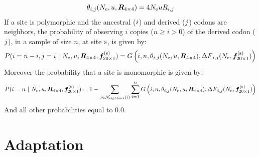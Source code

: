 \begin{equation}
\theta_{{i}, {j}}(N_{\textrm{e}}, u, \bm{R}_{4\times4}) = 4 N_{\textrm{e}} u R_{{i}, {j}}
\end{equation}
If a site is polymorphic and the ancestral (${i}$) and derived (${j}$) codons are neighbors, the probability of observing $i$ copies ($n \geq i > 0$) of the derived codon (${j}$), in a sample of size $n$, at site $\text{s}$, is given by:
\begin{equation}
P({i}=n-i,{j}=i \ |\ N_{\textrm{e}}, u, \bm{R}_{4\times4}, \bm{f}_{20\times1}^{(\text{s})}) = G\left(i, n, \theta_{{i}, {j}}(N_{\textrm{e}}, u, \bm{R}_{4\times4}), {\Delta F}_{{i}, {j}}(N_{\textrm{e}}, \bm{f}_{20\times1}^{(\text{s})}) \right)
\end{equation}
Moreover the probability that a site is monomorphic is given by:
\begin{equation}
P({i}= n \ |\ N_{\textrm{e}}, u, \bm{R}_{4\times4}, \bm{f}_{20\times1}^{(\text{s})}) = 1 - \sum_{{j} \in \mathcal{N}_{\mathrm{eighbors}}\left({i}\right)} \sum_{i=1}^{n} G\left(i, n, \theta_{{i}, {j}}(N_{\textrm{e}}, u, \bm{R}_{4\times4}), {\Delta F}_{{i}, {j}}(N_{\textrm{e}}, \bm{f}_{20\times1}^{(\text{s})})\right)
\end{equation}
And all other probabilities equal to $0.0$.

\section{Adaptation}


